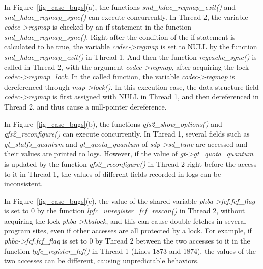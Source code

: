  In 
Figure~\ref{fig_case_bugs}(a), the functions {\em snd\_hdac\_regmap\_exit()} 
and {\em snd\_hdac\_regmap\_sync()} can execute concurrently. In Thread 2, the 
variable {\em codec->regmap} is checked by an if statement in the function {\em 
snd\_hdac\_regmap\_sync()}. Right after the condition of the if statement is 
calculated to be true, the variable {\em codec->regmap} is set to NULL by the 
function {\em snd\_hdac\_regmap\_exit()} in Thread 1. And then the function 
{\em regcache\_sync()} is called in Thread 2, with the argument {\em 
codec->regmap}, after acquiring the lock {\em codec->regmap\_lock}. In the 
called function, the variable {\em codec->regmap} is dereferenced through 
{\em map->lock()}. In this execution case, the data structure field {\em 
codec->regmap} is first assigned with NULL in Thread 1, and then dereferenced 
in Thread 2, and thus cause a null-pointer dereference.

 In 
Figure~\ref{fig_case_bugs}(b), the functions {\em gfs2\_show\_options()} and 
{\em gfs2\_reconfigure()} can execute concurrently. In Thread 1, several fields 
such as {\em gt\_statfs\_quantum} and {\em gt\_quota\_quantum} of {\em 
sdp->sd\_tune} are accessed and their values are printed to logs. However, if 
the value of {\em gt->gt\_quota\_quantum} is updated by the function {\em 
gfs2\_reconfigure()} in Thread 2 right before the access to it in Thread 1, the 
values of different fields recorded in logs can be inconsistent.

 In Figure~\ref{fig_case_bugs}(c), 
the value of the shared variable {\em phba->fcf.fcf\_flag} is set to 0 by the 
function {\em lpfc\_unregister\_fcf\_rescan()} in Thread 2, without acquiring 
the lock {\em phba->hbalock}, and this can cause double fetches in several 
program sites, even if other accesses are all protected by a lock. For example, 
if {\em phba->fcf.fcf\_flag} is set to 0 by Thread 2 between the two accesses 
to it in the function {\em lpfc\_register\_fcf()} in Thread 1 (Lines 1873 and 
1874), the values of the two accesses can be different, causing unpredictable 
behaviors.

